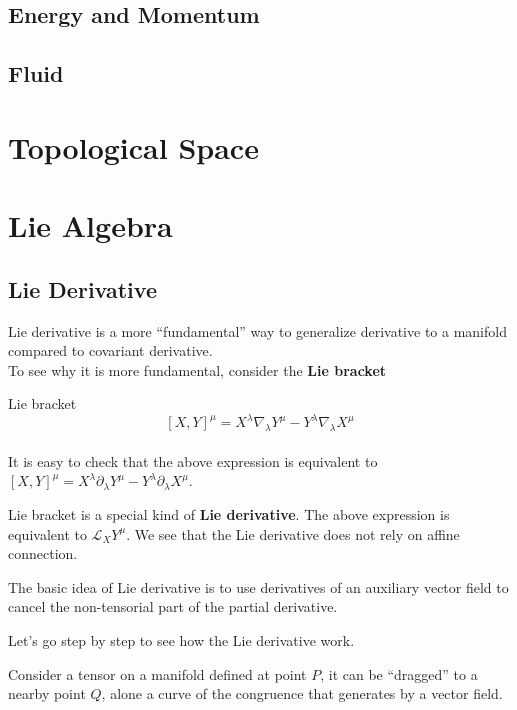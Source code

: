 \documentclass[12pt]{article}
\theoremstyle{mystyle}{\newtheorem{definition}{Definition}[section]}
\theoremstyle{mystyle}{\newtheorem{theorem}[definition]{Theorem}}
\theoremstyle{mystyle}{\newtheorem*{remark}{Remark}}
\theoremstyle{mystyle}{\newtheorem*{example}{Example}}
\theoremstyle{mystyle}{\newtheorem*{examples}{Examples}}
\theoremstyle{cstyle}{\newtheorem*{cthm}{}}
\begin{document}
\subsection{Energy and Momentum}
\subsection{Fluid}


\section{Topological Space}

\section{Lie Algebra}

\subsection{Lie Derivative}
Lie derivative is a more ``fundamental'' way to generalize derivative to a manifold compared to covariant derivative. \\
To see why it is more fundamental, consider the \textbf{Lie bracket}
\begin{definition}
  Lie bracket \\
  \[\left[X, Y\right]^{\mu}= X^{\lambda}\nabla_{\lambda}Y^{\mu} - Y^{\lambda}\nabla_\lambda X^{\mu}\]\\
  It is easy to check that the above expression is equivalent to
  \(\left[X, Y\right]^{\mu}= X^{\lambda}\partial_{\lambda}Y^{\mu} - Y^{\lambda}\partial_\lambda X^{\mu}\).
\end{definition}

Lie bracket is a special kind of \textbf{Lie derivative}. The above expression is equivalent to
\(\mathcal{L}_{X}Y^{\mu}\). We see that the Lie derivative does not rely on affine connection.

The basic idea of Lie derivative is to use derivatives of an auxiliary vector field to
cancel the non-tensorial part of the partial derivative.

Let's go step by step to see how the Lie derivative work.

Consider a tensor on a manifold defined at point \(P\), it can be ``dragged'' to a nearby point \(Q\), alone
a curve of the congruence that generates by a vector field.
\end{document}
